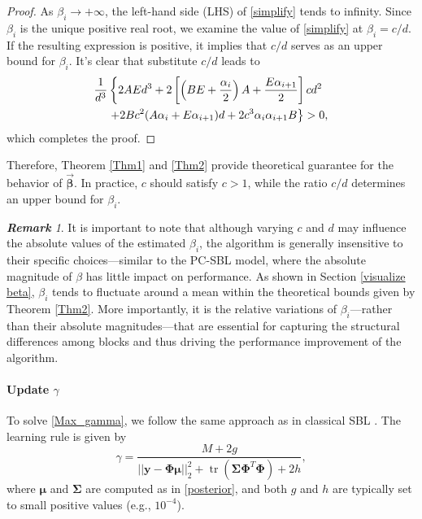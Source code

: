\documentclass[lettersize,journal]{IEEEtran}
\DeclareMathOperator{\tr}{tr}
\theoremstyle{remark}
\newtheorem{remark}{\textbf{Remark}}
\begin{document}
\begin{proof}
As \(\beta_i \to +\infty\), the left-hand side (LHS) of \eqref{simplify} tends to infinity. Since \(\beta_i\) is the unique positive real root, we examine the value of \eqref{simplify} at \(\beta_i = c/d\). If the resulting expression is positive, it implies that \(c/d\) serves as an upper bound for \(\beta_i\).  
	It's clear that substitute $c/d$ leads to
	\begin{align}
		\frac{1}{d^3}&\left\{2AEd^3+2\left[\left(BE+\frac{\alpha_i}{2}\right)A+\frac{E\alpha_{i+1}}{2}\right]cd^2 \right.\notag\\
		&\left.+2Bc^2(A\alpha_i+E\alpha_{i+1})d+2c^3\alpha_i \alpha_{i+1}B\right\}>0, \notag
	\end{align}
	which completes the proof.
\end{proof}



Therefore, Theorem \ref{Thm1} and \ref{Thm2} provide theoretical guarantee for  the behavior of $\vec{\boldsymbol{\beta}}$. In practice, \(c\) should satisfy \(c > 1\), while the ratio \(c/d\) determines an upper bound for \(\beta_i\).  


\begin{remark}
It is important to note that although varying \(c\) and \(d\) may influence the absolute values of the estimated \(\beta_i\), the algorithm is generally insensitive to their specific choices—similar to the PC-SBL model, where the absolute magnitude of $\beta$ has little impact on performance. {As shown in Section \ref{visualize beta},} \(\beta_i\) tends to fluctuate around a mean within the theoretical bounds given by Theorem \ref{Thm2}. More importantly, it is the relative variations of \(\beta_i\)—rather than their absolute magnitudes—that are essential for capturing the structural differences among blocks and thus driving the performance improvement of the algorithm.
\end{remark}

\vspace{2mm}

\paragraph{Update $\gamma$}

To solve \eqref{Max_gamma}, we follow the same approach as in classical SBL \cite{tipping2001sparse}. The learning rule is given by
\begin{equation}
	\gamma =\frac{M+2g}{\vert| \mathbf{y}-\boldsymbol{\Phi} \boldsymbol{\mu}\vert|_2^2 + \tr (\boldsymbol{\Sigma}\boldsymbol{\Phi}^T \boldsymbol{\Phi})+2h}, \label{update gamma}
\end{equation}
where $\boldsymbol{\mu}$ and $\boldsymbol{\Sigma}$ are computed as in \eqref{posterior}, and both $g$ and $h$ are typically set to small positive values (e.g., $10^{-4}$).
\end{document}
